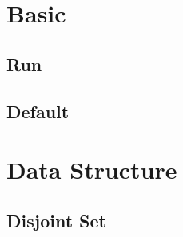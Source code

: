 \section{Basic}
    \subsection{Run}
        
    \subsection{Default}
        
    
\section{Data Structure}
    \subsection{Disjoint Set}
        